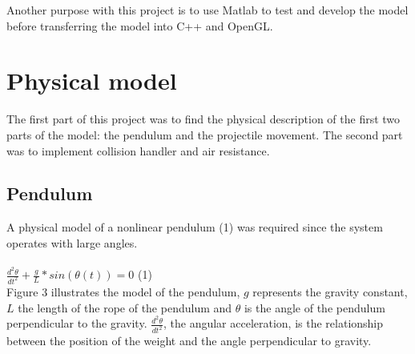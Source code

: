\documentclass[a4paper,12pt,twoside,english]{article}
\begin{document}
Another purpose with this project is to use Matlab to test and develop the model before transferring the model into C++ and OpenGL. 

\section{Physical model}
The first part of this project was to find the physical description of the first two parts of the model: the pendulum and the projectile movement. The second part was to implement collision handler and air resistance. 
\subsection{Pendulum}
A physical model of a nonlinear pendulum (1) was required since the system operates with large angles. \\ \\
$\frac{d^2\theta}{dt^2} + \frac{g}{L}*sin(\theta(t)) = 0$ \hfill (1) \\ 
Figure 3 illustrates the model of the pendulum, $g$ represents the gravity constant, $L$ the length of the rope of the pendulum and $\theta$ is the angle of the pendulum perpendicular to the gravity.  $\frac{d^2\theta}{dt^2}$, the angular acceleration, is the relationship between the position of the weight and the angle perpendicular to gravity.
\end{document}
